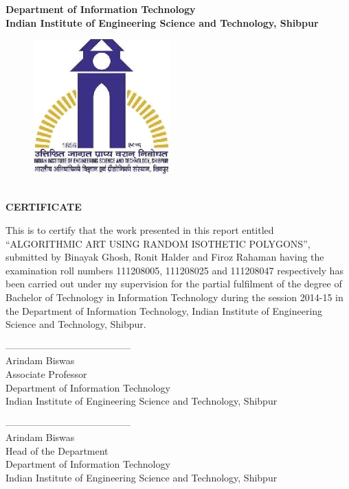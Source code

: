 \documentclass[12pt]{article}
\begin{document}
\newpage




\thispagestyle{empty}
\begin{center}
  \large \textbf{Department of Information Technology\\
  Indian Institute of Engineering Science and Technology, Shibpur}
\begin{figure}
  \centering
  \includegraphics[scale=1]{Logo_IIEST.eps}\\
\end{figure}
\\
 \vspace{1cm}
 \huge \textbf{CERTIFICATE}
 \vspace{1cm}
\end{center}
This is to certify that the work presented in this report entitled ``ALGORITHMIC ART USING RANDOM ISOTHETIC POLYGONS'', submitted by Binayak Ghosh, Ronit Halder and Firoz Rahaman having the examination roll numbers 111208005, 111208025 and 111208047 respectively has been carried out under my supervision for the partial fulfilment of the degree of Bachelor of Technology in Information Technology during the session 2014-15 in the Department of Information Technology, Indian Institute of Engineering Science and Technology, Shibpur.\\
\vspace{1.5cm}

\begin{minipage}[t]{0.48\linewidth}
\begin{flushleft}
---------------------------------------\\
Arindam Biswas\\
Associate Professor\\
Department of Information Technology\\
Indian Institute of Engineering Science and Technology, Shibpur
\end{flushleft}
\end{minipage}\hfill
\begin{minipage}[t]{0.48\linewidth}
\begin{flushright}
---------------------------------------\\
Arindam Biswas\\
Head of the Department\\
Department of Information Technology\\
Indian Institute of Engineering Science and Technology, Shibpur
\end{flushright}
\end{minipage}
\vspace{1.5cm}
\end{document}
